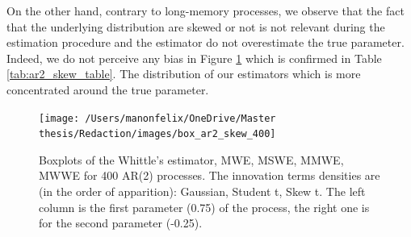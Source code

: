 \documentclass[
  11pt,
]{article}
\begin{document}
On the other hand, contrary to long-memory processes, we observe that
the fact that the underlying distribution are skewed or not is not
relevant during the estimation procedure and the estimator do not
overestimate the true parameter. Indeed, we do not perceive any bias in
Figure \ref{fig:ar2_skew} which is confirmed in Table
\ref{tab:ar2_skew_table}. The distribution of our estimators which is
more concentrated around the true parameter. 

\begin{figure}

{\centering \texttt{[image: /Users/manonfelix/OneDrive/Master thesis/Redaction/images/box\_ar2\_skew\_400]} 

}

\caption{Boxplots of the Whittle's estimator, MWE, MSWE, MMWE, MWWE for 400 AR(2) processes. The innovation terms densities are (in the order of apparition): Gaussian, Student t, Skew t. The left column is the first parameter (0.75) of the process, the right one is for the second parameter (-0.25).}\label{fig:ar2_skew}
\end{figure}
\end{document}
